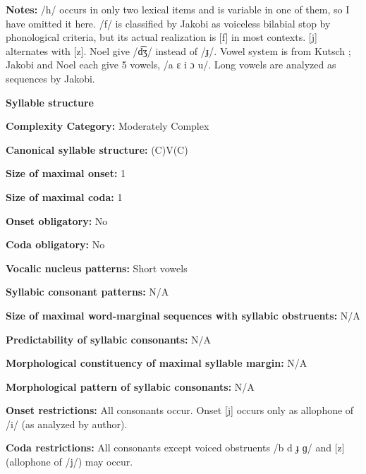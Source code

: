 \textbf{Notes:} /h/ occurs in only two lexical items and is variable in one of them, so I have omitted it here. /f/ is classified by Jakobi as voiceless bilabial stop by phonological criteria, but its actual realization is [f] in most contexts. [j] alternates with [z]. Noel give /d͡ʒ/ instead of /ɟ/. Vowel system is from Kutsch \citet{LojengaWaag2004}; Jakobi and Noel each give 5 vowels, /a ɛ i ɔ u/. Long vowels are analyzed as sequences by Jakobi.



\textbf{Syllable structure}



\textbf{Complexity Category:} Moderately Complex



\textbf{Canonical syllable structure:} (C)V(C) \citep[53-8]{Jakobi1990}



\textbf{Size of maximal onset:} 1



\textbf{Size of maximal coda:} 1



\textbf{Onset obligatory:} No



\textbf{Coda obligatory:} No



\textbf{Vocalic nucleus patterns:} Short vowels



\textbf{Syllabic consonant patterns:} N/A



\textbf{Size of maximal word{}-marginal sequences with syllabic obstruents:} N/A



\textbf{Predictability of syllabic consonants:} N/A



\textbf{Morphological constituency of maximal syllable margin:} N/A



\textbf{Morphological pattern of syllabic consonants:} N/A



\textbf{Onset restrictions:} All consonants occur. Onset [j] occurs only as allophone of /i/ (as analyzed by author).



\textbf{Coda restrictions:} All consonants except voiced obstruents /b d ɟ ɡ/ and [z] (allophone of /j/) may occur.



